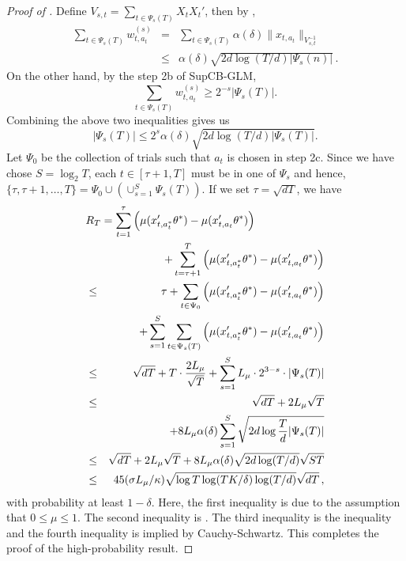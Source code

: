 \begin{proof}[Proof of ]
Define $V_{s,t}=\sum_{t \in \Psi_s(T)} X_tX_t'$, then by , 
\begin{eqnarray*}
\sum_{t \in \Psi_s(T)} w_{t,a_t}^{(s)} &=& \sum_{t \in \Psi_s(T)} \alpha(\delta) \|x_{t,a_t}\|_{V_{s,t}^{-1}} \\
&\le& \alpha(\delta) \sqrt{2 d \log(T/d) |\Psi_s(n)|}\,.
\end{eqnarray*}
On the other hand, by the step 2b of SupCB-GLM,
\begin{equation*}
\sum_{t \in \Psi_s(T)} w_{t,a_t}^{(s)} \ge 2^{-s} |\Psi_s(T)|.
\end{equation*}
Combining the above two inequalities gives us
\begin{equation} \label{eq:cardbound}
|\Psi_s(T)| \le 2^s \alpha(\delta) \sqrt{2 d\log{(T/d)} |\Psi_s(T)| }.
\end{equation}
Let $\Psi_0$ be the collection of trials such that $a_t$ is chosen in step 2c. Since we have chose $S=\log_2 T$, each $t \in [\tau+1, T]$ must be in one of $\Psi_s$ and hence, $\{\tau,\tau+1,\ldots,T\}=\Psi_0\cup \left(\cup_{s=1}^{S}\Psi_s(T)\right)$. If we set $\tau=\sqrt{dT}$, we have
\begin{eqnarray*}
\lefteqn{R_T = \sum_{t=1}^{\tau} \left( \mu(x_{t,a_t^*}' \theta^*) - \mu(x_{t,a_t}' \theta^*) \right)} \\
&& + \sum_{t=\tau+1}^{T} \left( \mu(x_{t,a_t^*}' \theta^*) - \mu(x_{t,a_t}' \theta^*) \right) \\
&\le & \tau + \sum_{t \in \Psi_0}  \left( \mu(x_{t,a_t^*}' \theta^*) - \mu(x_{t,a_t}' \theta^*)\right) \\
&& + \sum_{s=1}^{S}  \sum_{t \in \Psi_s(T)} \left( \mu(x_{t,a_t^*}' \theta^*) - \mu(x_{t,a_t}' \theta^*)\right) \\
&\le& \sqrt{dT} + T \cdot  \frac{2L_{\mu}}{\sqrt{T}} + \sum_{s=1}^{S}  L_\mu \cdot 2^{3-s} \cdot |\Psi_s(T)| \\
&\le& \sqrt{dT} + 2L_\mu \sqrt{T} \\
& & + 8L_\mu \alpha(\delta)  \sum_{s=1}^{S} \sqrt{2d \log\frac{T}{d} |\Psi_s(T)| } \\
&\le& \sqrt{dT} + 2L_\mu \sqrt{T} + 8L_\mu \alpha(\delta)   \sqrt{2d \log(T/d)} \sqrt{ST} \\
&\le& 45 (\sigma L_{\mu}/\kappa) \sqrt{\log T \log(TK/\delta)\log(T/d)} \sqrt{dT}\,,
\end{eqnarray*}
with probability at least $1 - \delta$. Here, the first inequality is due to the assumption that $0 \le \mu \le 1$. The second inequality is . The third inequality is the inequality  and the fourth inequality is implied by Cauchy-Schwartz. This completes the proof of the high-probability result. 
\end{proof}


